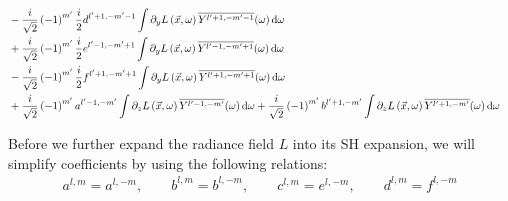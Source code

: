 \documentclass[10pt]{scrartcl}
\begin{document}
\begin{align*}
\\&
-\frac{i}{\sqrt{2}}\left({-1}\right)^{m'}\frac{i}{2}d^{{l'+1,-m'-1}}\int{\partial_yL\left (\vec{x} ,\omega \right )\overline{Y^{l'+1, -m'-1}}(\omega )\,\mathrm{d}\omega}
\\&
+\frac{i}{\sqrt{2}}\left({-1}\right)^{m'}\frac{i}{2}e^{{l'-1,-m'+1}}\int{\partial_yL\left (\vec{x} ,\omega \right )\overline{Y^{l'-1, -m'+1}}(\omega )\,\mathrm{d}\omega}
\\&
-\frac{i}{\sqrt{2}}\left({-1}\right)^{m'}\frac{i}{2}f^{{l'+1,-m'+1}}\int{\partial_yL\left (\vec{x} ,\omega \right )\overline{Y^{l'+1, -m'+1}}(\omega )\,\mathrm{d}\omega}
\\&
+\frac{i}{\sqrt{2}}\left({-1}\right)^{m'}a^{{l'-1,-m'}}\int{\partial_zL\left (\vec{x} ,\omega \right )\overline{Y^{l'-1, -m'}}(\omega )\,\mathrm{d}\omega}+\frac{i}{\sqrt{2}}\left({-1}\right)^{m'}b^{{l'+1,-m'}}\int{\partial_zL\left (\vec{x} ,\omega \right )\overline{Y^{l'+1, -m'}}(\omega )\,\mathrm{d}\omega}
\end{align*}

Before we further expand the radiance field $L$ into its SH expansion, we will simplify coefficients by using the following relations:
\begin{align}
a^{l,m} = a^{l,-m}, \qquad
b^{l,m} = b^{l,-m}, \qquad
c^{l,m} = e^{l,-m}, \qquad
d^{l,m} = f^{l,-m}
\label{eq:recursion_identities}
\end{align}
\end{document}

